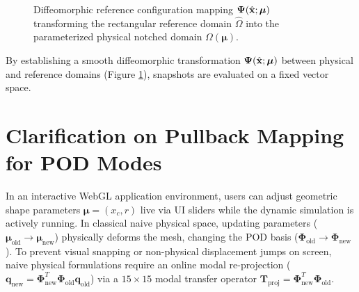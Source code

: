 \begin{figure}[htbp]
    \caption{Diffeomorphic reference configuration mapping $\boldsymbol{\Psi}(\hat{\mathbf{x}}; \boldsymbol{\mu})$ transforming the rectangular reference domain $\hat{\Omega}$ into the parameterized physical notched domain $\Omega(\boldsymbol{\mu})$.}
    \label{fig:pullback_mapping_dt}
\end{figure}

By establishing a smooth diffeomorphic transformation $\boldsymbol{\Psi}(\hat{\mathbf{x}}; \boldsymbol{\mu})$ between physical and reference domains (Figure \ref{fig:pullback_mapping_dt}), snapshots are evaluated on a fixed vector space.

\section{Clarification on Pullback Mapping for POD Modes}
\label{sec:state_projection}

In an interactive WebGL application environment, users can adjust geometric shape parameters $\boldsymbol{\mu} = (x_c, r)$ live via UI sliders while the dynamic simulation is actively running. In classical naive physical space, updating parameters ($\boldsymbol{\mu}_{\text{old}} \to \boldsymbol{\mu}_{\text{new}}$) physically deforms the mesh, changing the POD basis ($\boldsymbol{\Phi}_{\text{old}} \to \boldsymbol{\Phi}_{\text{new}}$). To prevent visual snapping or non-physical displacement jumps on screen, naive physical formulations require an online modal re-projection ($\mathbf{q}_{\text{new}} = \boldsymbol{\Phi}_{\text{new}}^T \boldsymbol{\Phi}_{\text{old}} \mathbf{q}_{\text{old}}$) via a $15 \times 15$ modal transfer operator $\mathbf{T}_{\text{proj}} = \boldsymbol{\Phi}_{\text{new}}^T \boldsymbol{\Phi}_{\text{old}}$.

